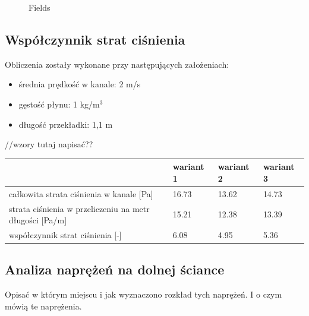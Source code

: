\documentclass[peerreview]{IEEEtran}
\begin{document}
\begin{figure}
  \hfill
  \caption{Fields}
  \label{subplots1310}
\end{figure}



\subsection{Współczynnik strat ciśnienia}

Obliczenia zostały wykonane przy następujących założeniach:
\begin{itemize}
\item średnia prędkość w kanale: 2 m/s
\item gęstość płynu: 1 kg/m$^3$
\item długość przekładki: 1,1 m
\end{itemize}

//wzory tutaj napisać??

\begin{table}[]
\begin{tabular}{|l|l|l|l|}
\hline
 & wariant 1 & wariant 2 & wariant 3 \\ \hline
całkowita strata ciśnienia w kanale {[}Pa{]} & 16.73 & 13.62 & 14.73 \\ \hline
strata ciśnienia w przeliczeniu na metr długości {[}Pa/m{]} & 15.21 & 12.38 & 13.39 \\ \hline
współczynnik strat ciśnienia {[}-{]} & 6.08 & 4.95 & 5.36 \\ \hline
\end{tabular}
\end{table}

\subsection{Analiza naprężeń na dolnej ściance}

Opisać w którym miejscu i jak wyznaczono rozkład tych naprężeń. I o czym mówią te naprężenia. 
\end{document}
